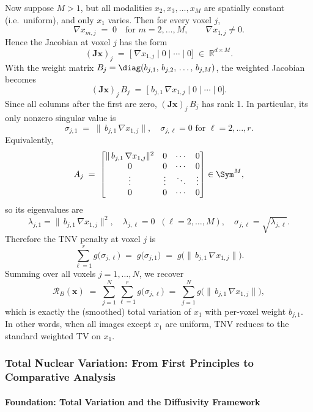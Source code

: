 Now suppose \(M>1\), but all modalities \(x_2, x_3, \dots, x_M\) are spatially constant (i.e.\ uniform), and only \(x_1\) varies.  Then for every voxel \(j\),
\[
  \nabla x_{m,j} \;=\; 0
  \quad\text{for }m=2,\dots,M,
  \qquad
  \nabla x_{1,j}\neq 0.
\]
Hence the Jacobian at voxel \(j\) has the form
\[
  (\mathbf{J} \mathbf{x})_j 
  \;=\; 
  \bigl[\;\nabla x_{1,j}\;\big|\;0\;\big|\;\cdots\;\big|\;0\bigr]
  \;\in\;\mathbb{R}^{d\times M}.
\]
With the weight matrix \(B_j = \diag(b_{j,1},\,b_{j,2},\,\dots,\,b_{j,M})\), the weighted Jacobian becomes
\[
  (\mathbf{J} \mathbf{x})_j\,B_j
  \;=\; 
  \bigl[\;b_{j,1}\,\nabla x_{1,j}\;\big|\;0\;\big|\;\cdots\;\big|\;0\bigr].
\]
Since all columns after the first are zero, \((\mathbf{J} \mathbf{x})_j\,B_j\) has rank 1.  In particular, its only nonzero singular value is
\[
  \sigma_{j,1}
  \;=\; 
  \bigl\lVert\,b_{j,1}\,\nabla x_{1,j}\bigr\rVert,
  \quad
  \sigma_{j,\ell}=0 \text{ for } \ell=2,\dots,r.
\]
Equivalently, 
\[
  A_j
  \;=\; 
  \begin{bmatrix}
    \lVert\,b_{j,1}\,\nabla x_{1,j}\rVert^2 & 0 & \cdots & 0 \\
    0 & 0 & \cdots & 0 \\
    \vdots & \vdots & \ddots & \vdots \\
    0 & 0 & \cdots & 0
  \end{bmatrix}
  \in\Sym^M,
\]
so its eigenvalues are
\[
  \lambda_{j,1} = \lVert\,b_{j,1}\,\nabla x_{1,j}\rVert^2,
  \quad
  \lambda_{j,\ell}=0 \;\;(\ell=2,\dots,M),
  \quad
  \sigma_{j,\ell} = \sqrt{\lambda_{j,\ell}}.
\]
Therefore the TNV penalty at voxel \(j\) is
\[
  \sum_{\ell=1}^r g\bigl(\sigma_{j,\ell}\bigr)
  \;=\; 
  g\bigl(\sigma_{j,1}\bigr)
  \;=\; 
  g\bigl(\lVert\,b_{j,1}\,\nabla x_{1,j}\rVert\bigr).
\]
Summing over all voxels \(j=1,\dots,N\), we recover
\[
  \mathcal{R}_B(\mathbf{x})
  \;=\;
  \sum_{j=1}^N \sum_{\ell=1}^r g\bigl(\sigma_{j,\ell}\bigr)
  \;=\; 
  \sum_{j=1}^N g\bigl(\lVert\,b_{j,1}\,\nabla x_{1,j}\rVert\bigr),
\]
which is exactly the (smoothed) total variation of \(x_1\) with per‐voxel weight \(b_{j,1}\).  In other words, when all images except \(x_1\) are uniform, TNV reduces to the standard weighted TV on \(x_1\).

\hrulefill

\subsubsection{Total Nuclear Variation: From First Principles to Comparative Analysis}

\paragraph{Foundation: Total Variation and the Diffusivity Framework}

